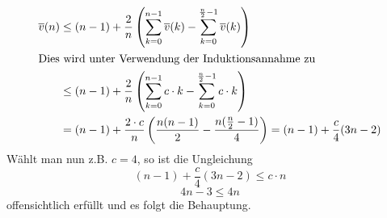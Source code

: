 \begin{flushenum}
\begin{itemize}
		\begin{align*}
			\overline{v}(n) &\leq (n-1) + \frac{2}{n}
			\left(\sum_{k=0}^{n-1} \overline{v}(k) -
			\sum_{k=0}^{\frac{n}{2}-1} \overline{v}(k)\right) \\
			\intertext{Dies wird unter Verwendung der Induktionsannahme zu}
			&\leq (n-1) + \frac{2}{n} \left(\sum_{k=0}^{n-1}
			c \cdot k - \sum_{k=0}^{\frac{n}{2}-1} c \cdot k\right) \\
			&= (n-1) + \frac{2\cdot c}{n} \left(\frac{n(n-1)}{2}-\frac{n(\frac{n}{2}-1)}{4}\right) = (n-1) + \frac{c}{4} (3n - 2)
		\end{align*}
		Wählt man nun z.B. $c = 4$, so ist die Ungleichung
			\[ (n-1) + \frac{c}{4} (3n - 2) \leq c \cdot n \]
			\[ 4n-3 \leq 4n \]
		offensichtlich erfüllt und es folgt die Behauptung.
\end{itemize}
\end{flushenum}

